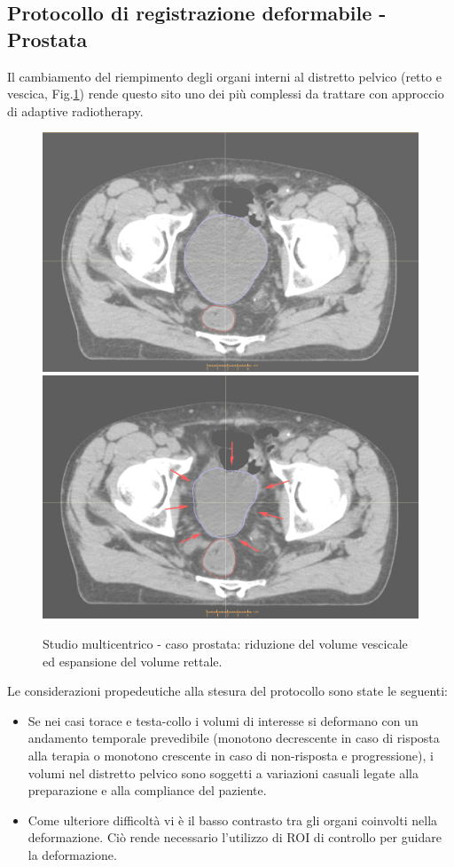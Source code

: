\subsection{Protocollo di registrazione deformabile - Prostata}
Il cambiamento del riempimento degli organi interni al distretto pelvico (retto e vescica, Fig.\ref{fig:YES_PR}) rende questo sito uno dei più complessi da trattare con approccio di adaptive radiotherapy. 
\begin{figure}
\centering
\includegraphics[width=.48\textwidth]{./cap3/YES_PR.png}
\includegraphics[width=.48\textwidth]{./cap3/YES_PR_shrink.png}
\caption{Studio multicentrico - caso prostata: riduzione del volume vescicale ed espansione del volume rettale.}
\label{fig:YES_PR}
\end{figure}

Le considerazioni propedeutiche alla stesura del protocollo sono state le seguenti:
\begin{itemize}
\item Se nei casi torace e testa-collo i volumi di interesse si deformano con un andamento temporale prevedibile (monotono decrescente in caso di risposta alla terapia o monotono crescente in caso di non-risposta e progressione), i volumi nel distretto pelvico sono soggetti a variazioni casuali legate alla preparazione e alla compliance del paziente.
\item Come ulteriore difficoltà vi è il basso contrasto tra gli organi coinvolti nella deformazione. Ciò rende necessario l'utilizzo di ROI di controllo per guidare la deformazione.
\end{itemize}
 
